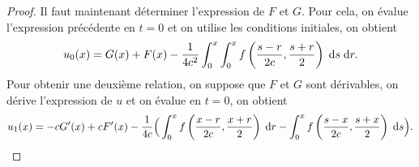 \documentclass[12pt,a4paper,twoside]{article}
\begin{document}
\begin{proof}
  Il faut maintenant d\'eterminer l'expression de $F$ et $G$.
  Pour cela, on \'evalue l'expression pr\'ec\'edente en $t=0$ et on utilise
  les conditions initiales, on obtient
  \begin{align}
    \label{eq:proof_DAlembert_u0}
    u_0(x) = G(x) + F(x)
    - \dfrac{1}{4c^2} \int_{0}^{x} \int_0^{x} f\left(\dfrac{s-r}{2c} , \dfrac{s+r}{2}\right)
    \;\mathrm{d} s \;\mathrm{d} r .
  \end{align}
  Pour obtenir une deuxi\`eme relation, on suppose que $F$ et $G$ sont
  d\'erivables, on d\'erive l'expression de $u$ et on \'evalue en $t=0$,
  on obtient
  \begin{align}
    \label{eq:proof_DAlembert_u1}
    u_1(x) = - c G'(x) + c F'(x) - \dfrac{1}{4c} \Big( 
    \int_{0}^x f\left(\dfrac{x-r}{2c},\dfrac{x+r}{2}\right) \;\mathrm{d} r
    - \int_0^x f\left(\dfrac{s-x}{2c},\dfrac{s+x}{2}\right) \;\mathrm{d} s
    \Big) .
  \end{align}


\end{proof}
\end{document}
